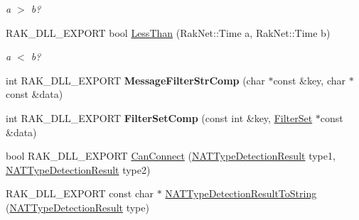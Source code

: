 \begin{DoxyCompactItemize}
\begin{DoxyCompactList}\small\item\em a $>$ b? \end{DoxyCompactList}\item 
\hypertarget{namespace_rak_net_ae0757a047bdddd79a52a8fc5f71e22f1}{R\-A\-K\-\_\-\-D\-L\-L\-\_\-\-E\-X\-P\-O\-R\-T bool \hyperlink{namespace_rak_net_ae0757a047bdddd79a52a8fc5f71e22f1}{Less\-Than} (Rak\-Net\-::\-Time a, Rak\-Net\-::\-Time b)}\label{namespace_rak_net_ae0757a047bdddd79a52a8fc5f71e22f1}

\begin{DoxyCompactList}\small\item\em a $<$ b? \end{DoxyCompactList}\item 
\hypertarget{namespace_rak_net_a9a83d9915b367b7a3830849ff1cd206a}{int R\-A\-K\-\_\-\-D\-L\-L\-\_\-\-E\-X\-P\-O\-R\-T {\bfseries Message\-Filter\-Str\-Comp} (char $\ast$const \&key, char $\ast$const \&data)}\label{namespace_rak_net_a9a83d9915b367b7a3830849ff1cd206a}

\item 
\hypertarget{namespace_rak_net_a9b42225885a01cb9b0749efddb5f8f30}{int R\-A\-K\-\_\-\-D\-L\-L\-\_\-\-E\-X\-P\-O\-R\-T {\bfseries Filter\-Set\-Comp} (const int \&key, \hyperlink{struct_rak_net_1_1_filter_set}{Filter\-Set} $\ast$const \&data)}\label{namespace_rak_net_a9b42225885a01cb9b0749efddb5f8f30}

\item 
bool R\-A\-K\-\_\-\-D\-L\-L\-\_\-\-E\-X\-P\-O\-R\-T \hyperlink{namespace_rak_net_a1b3644d668610a1cb839748907c83e65}{Can\-Connect} (\hyperlink{namespace_rak_net_a81848fd95488939c0b3e217209f31139}{N\-A\-T\-Type\-Detection\-Result} type1, \hyperlink{namespace_rak_net_a81848fd95488939c0b3e217209f31139}{N\-A\-T\-Type\-Detection\-Result} type2)
\item 
\hypertarget{namespace_rak_net_ac89c0a6308f35b933825a354dbf4a219}{R\-A\-K\-\_\-\-D\-L\-L\-\_\-\-E\-X\-P\-O\-R\-T const char $\ast$ \hyperlink{namespace_rak_net_ac89c0a6308f35b933825a354dbf4a219}{N\-A\-T\-Type\-Detection\-Result\-To\-String} (\hyperlink{namespace_rak_net_a81848fd95488939c0b3e217209f31139}{N\-A\-T\-Type\-Detection\-Result} type)}\label{namespace_rak_net_ac89c0a6308f35b933825a354dbf4a219}


\end{DoxyCompactItemize}
